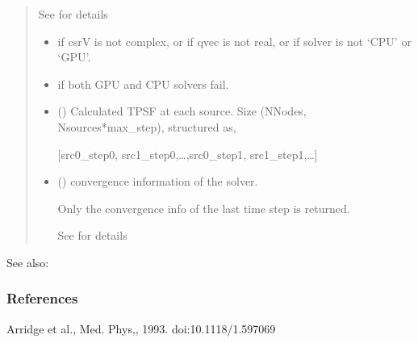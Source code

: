 \documentclass[letterpaper,10pt,english]{sphinxmanual}
\begin{document}
\begin{fulllineitems}
\begin{quote}
\begin{description}
\begin{itemize}
\sphinxAtStartPar
See {\hyperref[\detokenize{_autosummary/nirfasterff.utils.SolverOptions:nirfasterff.utils.SolverOptions}]{}} for details


\end{itemize}

\begin{itemize}
\item {} 
\sphinxAtStartPar
{} \textendash{} if csrV is not complex, or if qvec is not real, or if solver is not ‘CPU’ or ‘GPU’.

\item {} 
\sphinxAtStartPar
{} \textendash{} if both GPU and CPU solvers fail.

\end{itemize}

\sphinxAtStartPar
\begin{itemize}
\item {} 
\sphinxAtStartPar
{} () \textendash{} Calculated TPSF at each source. Size (NNodes, Nsources*max\_step), structured as,

\sphinxAtStartPar
{[}src0\_step0, src1\_step0,…,src0\_step1, src1\_step1,…{]}

\item {} 
\sphinxAtStartPar
{} () \textendash{} convergence information of the solver.

\sphinxAtStartPar
Only the convergence info of the last time step is returned.

\sphinxAtStartPar
See {\hyperref[\detokenize{_autosummary/nirfasterff.utils.ConvergenceInfo:nirfasterff.utils.ConvergenceInfo}]{}} for details

\end{itemize}


\end{description}\end{quote}


\begin{sphinxseealso}{See also:}

\sphinxAtStartPar
{\hyperref[\detokenize{_autosummary/nirfasterff.math.gen_mass_matrix:nirfasterff.math.gen_mass_matrix}]{}}


\end{sphinxseealso}

\subsubsection*{References}

\sphinxAtStartPar
Arridge et al., Med. Phys,, 1993. doi:10.1118/1.597069

\end{fulllineitems}
\end{document}

